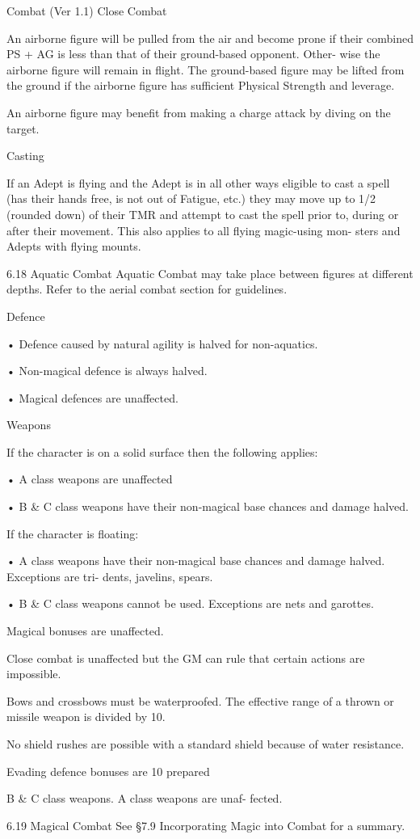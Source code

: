 \begin{Chapter}{Combat (Ver 1.1)}
Close Combat 

An  airborne  figure  will  be  pulled  from the  air and 
become  prone  if  their  combined  PS  +  AG  is  less 
than  that  of  their  ground-based  opponent.  Other-
wise  the  airborne  figure  will  remain in  flight.  The 
ground-based figure may be lifted from the ground 
if  the  airborne  figure  has  sufficient  Physical 
Strength and leverage. 

An  airborne  figure  may  benefit  from  making  a 
charge attack by diving on the target. 

Casting 

If  an  Adept  is  flying  and  the  Adept  is  in  all  other 
ways eligible to cast a spell (has their hands free, is 
not  out  of  Fatigue,  etc.)  they  may  move  up  to  1/2 
(rounded  down)  of  their  TMR  and  attempt  to  cast 
the  spell  prior  to,  during  or  after  their  movement. 
This  also  applies  to  all  flying  magic-using  mon-
sters and Adepts with flying mounts. 

6.18 Aquatic Combat 
Aquatic Combat may take place between figures at 
different depths. Refer to the aerial combat section 
for guidelines. 

Defence  

•  Defence  caused  by  natural  agility  is  halved  for 
non-aquatics.  

• Non-magical defence is always halved.  

• Magical defences are unaffected. 

Weapons 

If  the  character  is  on  a  solid  surface  then  the 
following applies:  

• A class weapons are unaffected  

• B \& C class weapons have their non-magical base 
chances and damage halved. 

If the character is floating:  

•  A  class  weapons  have  their  non-magical  base 
chances  and  damage  halved.  Exceptions  are  tri-
dents, javelins, spears.  

• B \& C class weapons cannot be used. Exceptions 
are nets and garottes. 

Magical bonuses are unaffected. 

Close  combat  is  unaffected  but  the  GM  can  rule 
that certain actions are impossible. 

Bows  and  crossbows  must  be  waterproofed.  The 
effective  range  of  a  thrown  or  missile  weapon  is 
divided by 10. 

No shield rushes are possible with a standard shield 
because of water resistance. 

Evading defence bonuses are 10%
prepared 

B  \&  C  class  weapons.  A  class  weapons  are  unaf-
fected. 

6.19 Magical Combat 
See  §7.9  Incorporating  Magic  into  Combat  for  a 
summary. 

\end{Chapter}
